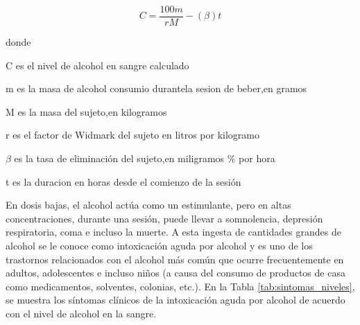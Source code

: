 \begin{equation} \label{eq_bac}
    C=\frac{100m}{rM}-(\beta)t
\end{equation}
\par
donde \par
C es el nivel de alcohol en sangre calculado \par
m es la masa de alcohol consumio durantela sesion de beber,en gramos\par
M es la masa del sujeto,en kilogramos \par
r es el factor de Widmark del sujeto en litros por kilogramo \par
$\beta$ es la tasa de eliminación del sujeto,en miligramos \% por hora \par
t es la duracion en horas desde el comienzo de la sesión \\ \par
En dosis bajas, el alcohol actúa como un estimulante, pero en altas concentraciones, durante una sesión, puede llevar a somnolencia, depresión respiratoria, coma e incluso la muerte. A esta ingesta de cantidades grandes de alcohol se le conoce como intoxicación aguda por alcohol y es uno de los trastornos relacionados con el alcohol más común que ocurre frecuentemente en adultos, adolescentes e incluso niños (a causa del consumo de productos de casa como medicamentos, solventes, colonias, etc.). En la Tabla \ref{tab:sintomas_niveles}, se muestra los síntomas clínicos de la intoxicación aguda por alcohol de acuerdo con el nivel de alcohol en la sangre. \cite{alcohol_consumption_and_ethyl,alcohol_calculations,alcohol_brief_overview} \\ \par
